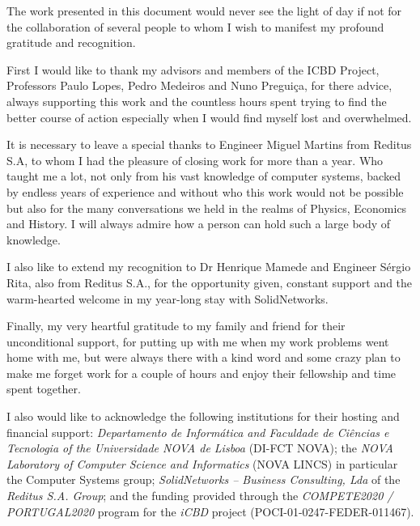 \acknowledgements

The work presented in this document would never see the light of day if not for the collaboration of several people to whom I wish to manifest my profound gratitude and recognition. 

First I would like to thank my advisors and members of the ICBD Project, Professors Paulo Lopes, Pedro Medeiros and Nuno Preguiça, for there advice, always supporting this work and the countless hours spent trying to find the better course of action especially when I would find myself lost and overwhelmed.

It is necessary to leave a special thanks to Engineer Miguel Martins from Reditus S.A, to whom I had the pleasure of closing work for more than a year. Who taught me a lot, not only from his vast knowledge of computer systems, backed by endless years of experience and without who this work would not be possible but also for the many conversations we held in the realms of Physics, Economics and History. I will always admire how a person can hold such a large body of knowledge.

I also like to extend my recognition to Dr Henrique Mamede and Engineer Sérgio Rita, also from Reditus S.A., for the opportunity given, constant support and the warm-hearted welcome in my year-long stay with SolidNetworks.

Finally, my very heartful gratitude to my family and friend for their unconditional support, for putting up with me when my work problems went home with me, but were always there with a kind word and some crazy plan to make me forget work for a couple of hours and enjoy their fellowship and time spent together.

I also would like to acknowledge the following institutions for their hosting and financial support: \textit{Departamento de Informática and Faculdade de Ciências e Tecnologia of the Universidade NOVA de Lisboa} (DI-FCT NOVA); the \textit{NOVA Laboratory of Computer Science and Informatics} (NOVA LINCS) in particular the Computer Systems group; \textit{SolidNetworks – Business Consulting, Lda} of the \textit{Reditus S.A. Group}; and the funding provided through the \textit{COMPETE2020 / PORTUGAL2020} program for the \textit{iCBD} project (POCI-01-0247-FEDER-011467).